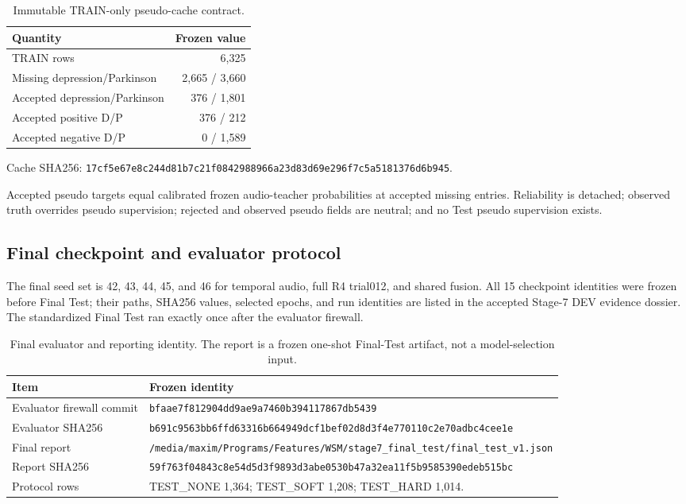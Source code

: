 \begin{table}[t]
\centering\scriptsize
\caption{Immutable TRAIN-only pseudo-cache contract.}
\label{tab:app-pseudo}
\begin{tabular}{p{}r}
\toprule
Quantity & Frozen value\\
\midrule
TRAIN rows & 6,325\\
Missing depression/Parkinson & 2,665 / 3,660\\
Accepted depression/Parkinson & 376 / 1,801\\
Accepted positive D/P & 376 / 212\\
Accepted negative D/P & 0 / 1,589\\
\bottomrule
\end{tabular}
\end{table}

\noindent\scriptsize Cache SHA256: {\tiny\texttt{17cf5e67e8c244d81b7c21f0842988966a23d83d69e296f7c5a5181376d6b945}}.

Accepted pseudo targets equal calibrated frozen audio-teacher probabilities at accepted missing entries. Reliability is detached; observed truth overrides pseudo supervision; rejected and observed pseudo fields are neutral; and no Test pseudo supervision exists.

\subsection{Final checkpoint and evaluator protocol}

The final seed set is 42, 43, 44, 45, and 46 for temporal audio, full R4 trial012, and shared fusion. All 15 checkpoint identities were frozen before Final Test; their paths, SHA256 values, selected epochs, and run identities are listed in the accepted Stage-7 DEV evidence dossier. The standardized Final Test ran exactly once after the evaluator firewall.

\begin{table}[t]
\centering\scriptsize
\caption{Final evaluator and reporting identity. The report is a frozen one-shot Final-Test artifact, not a model-selection input.}
\label{tab:app-evaluator}
\begin{tabular}{p{}p{}}
\toprule
Item & Frozen identity\\
\midrule
Evaluator firewall commit & \texttt{bfaae7f812904dd9ae9a7460b394117867db5439}\\
Evaluator SHA256 & \texttt{b691c9563bb6ffd63316b664949dcf1bef02d8d3f4e770110c2e70adbc4cee1e}\\
Final report & \texttt{/media/maxim/Programs/Features/WSM/stage7\_final\_test/final\_test\_v1.json}\\
Report SHA256 & \texttt{59f763f04843c8e54d5d3f9893d3abe0530b47a32ea11f5b9585390edeb515bc}\\
Protocol rows & TEST\_NONE 1,364; TEST\_SOFT 1,208; TEST\_HARD 1,014.\\
\bottomrule
\end{tabular}
\end{table}

